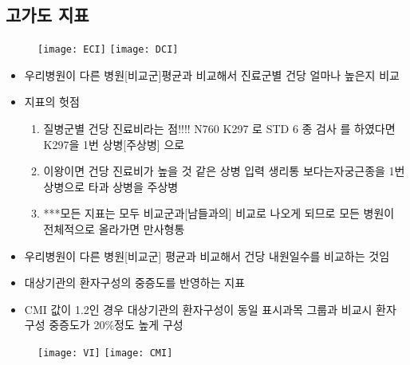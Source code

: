 \subsection{고가도 지표}
\begin{figure}
\centering
  \centering
  \texttt{[image: ECI]}
  \centering
  \texttt{[image: DCI]}
\end{figure}
\begin{itemize}\tightlist
\item 우리병원이 다른 병원[비교군]평균과 비교해서 진료군별 건당 얼마나 높은지 비교
\item 지표의 헛점
	\begin{enumerate}[1.]\tightlist
	\item 질병군별 건당 진료비라는 점!!!! N760 K297 로  STD 6 종 검사 를 하였다면 K297을 1번 상병[주상병] 으로
	\item 이왕이면 건당 진료비가 높을 것 같은 상병 입력 생리통 보다는자궁근종을 1번 상병으로 타과 상병을 주상병
	\item ***모든 지표는 모두 비교군과[남들과의] 비교로 나오게 되므로 모든 병원이 전체적으로 올라가면 만사형통
	\end{enumerate}
\end{itemize}
\begin{itemize}\tightlist
\item 우리병원이 다른 병원[비교군] 평균과 비교해서 건당 내원일수를 비교하는 것임
\end{itemize}
\begin{itemize}\tightlist
\item 대상기관의 환자구성의 중증도를 반영하는 지표
\item CMI 값이 1.2인 경우 대상기관의 환자구성이 동일 표시과목 그룹과 비교시 환자 구성 중증도가 20\%정도 높게 구성
\end{itemize}

\begin{figure}
\centering
  \centering
  \texttt{[image: VI]}
  \centering
  \texttt{[image: CMI]}
\end{figure}



